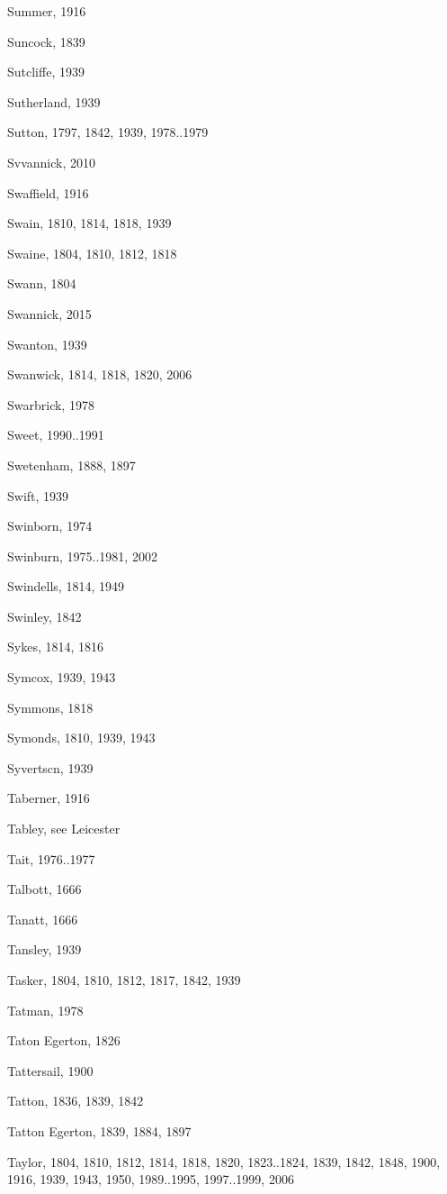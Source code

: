 {\begin{theindex}
\item Summer, 1916
\item Suncock, 1839
\item Sutcliffe, 1939
\item Sutherland, 1939
\item Sutton, 1797, 1842, 1939, 1978..1979
\item Svvannick, 2010
\item Swaffield, 1916
\item Swain, 1810, 1814, 1818, 1939
\item Swaine, 1804, 1810, 1812, 1818
\item Swann, 1804
\item Swannick, 2015
\item Swanton, 1939
\item Swanwick, 1814, 1818, 1820, 2006
\item Swarbrick, 1978
\item Sweet, 1990..1991
\item Swetenham, 1888, 1897
\item Swift, 1939
\item Swinborn, 1974
\item Swinburn, 1975..1981, 2002
\item Swindells, 1814, 1949
\item Swinley, 1842
\item Sykes, 1814, 1816
\item Symcox, 1939, 1943
\item Symmons, 1818
\item Symonds, 1810, 1939, 1943
\item Syvertscn, 1939
\item Taberner, 1916
\item Tabley, see Leicester
\item Tait, 1976..1977
\item Talbott, 1666
\item Tanatt, 1666
\item Tansley, 1939
\item Tasker, 1804, 1810, 1812, 1817, 1842, 1939
\item Tatman, 1978
\item Taton Egerton, 1826
\item Tattersail, 1900
\item Tatton, 1836, 1839, 1842
\item Tatton Egerton, 1839, 1884, 1897
\item Taylor, 1804, 1810, 1812, 1814, 1818, 1820, 1823..1824, 1839, 1842, 1848, 1900, 1916, 1939, 1943, 1950, 1989..1995, 1997..1999, 2006

\end{theindex}}

